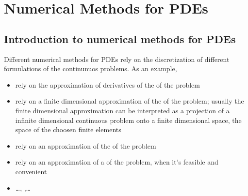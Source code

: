 \documentclass[letterpaper,10pt,english]{jupyterBook}
\begin{document}
\part{Numerical Methods for PDEs}

\sphinxstepscope


\chapter{Introduction to numerical methods for PDEs}
\label{\detokenize{ch/pde/numerics:introduction-to-numerical-methods-for-pdes}}\label{\detokenize{ch/pde/numerics:pde-numerics}}\label{\detokenize{ch/pde/numerics::doc}}
\sphinxAtStartPar
Different numerical methods for PDEs rely on the discretization of different formulations of the continunuos problems. As an example,
\begin{itemize}
\item {} 
\sphinxAtStartPar
{} rely on the approximation of derivatives of the  of the problem

\item {} 
\sphinxAtStartPar
{\hyperref[\detokenize{ch/pde/fem:pde-fem}]{}} rely on a finite dimensional approximation of the  of the problem; usually the finite dimensional approximation can be interpreted as a projection of a infinite dimensional continuous problem onto a finite dimensional space, the space of the choosen finite elements

\item {} 
\sphinxAtStartPar
{\hyperref[\detokenize{ch/pde/fvm:pde-fvm}]{}} rely on an approximation of the  of the problem

\item {} 
\sphinxAtStartPar
{} rely on an approximation of a  of  the problem, when it’s feasible and convenient

\item {} 
\sphinxAtStartPar
…, ,…

\end{itemize}
\end{document}
